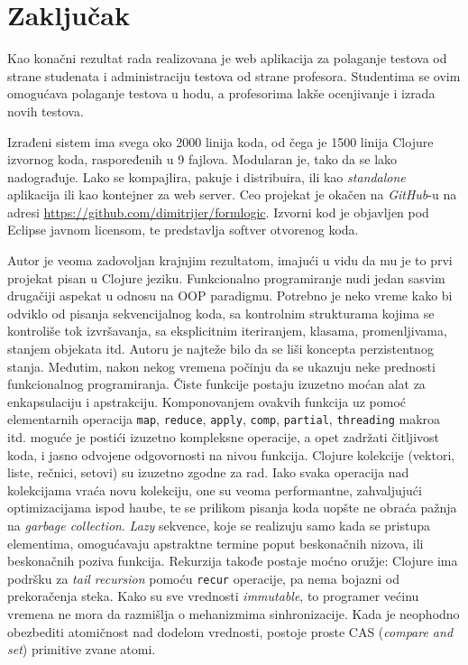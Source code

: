\chapter{Zaključak}\label{zakljucak}
Kao konačni rezultat rada realizovana je web aplikacija za polaganje testova od strane studenata i administraciju testova od strane profesora. Studentima se ovim omogućava polaganje testova u hodu, a profesorima lakše ocenjivanje i izrada novih testova.

Izrađeni sistem ima svega oko 2000 linija koda, od čega je 1500 linija Clojure izvornog koda, raspoređenih u 9 fajlova. Modularan je, tako da se lako nadograđuje. Lako se kompajlira, pakuje i distribuira, ili kao \textit{standalone} aplikacija ili kao kontejner za web server. Ceo projekat je okačen na \textit{GitHub}-u na adresi \url{https://github.com/dimitrijer/formlogic}. Izvorni kod je objavljen pod Eclipse javnom licensom, te predstavlja softver otvorenog koda.

Autor je veoma zadovoljan krajnjim rezultatom, imajući u vidu da mu je to prvi projekat pisan u Clojure jeziku. Funkcionalno programiranje nudi jedan sasvim drugačiji aspekat u odnosu na OOP paradigmu. Potrebno je neko vreme kako bi odviklo od pisanja sekvencijalnog koda, sa kontrolnim strukturama kojima se kontroliše tok izvršavanja, sa eksplicitnim iteriranjem, klasama, promenljivama, stanjem objekata itd. Autoru je najteže bilo da se liši koncepta perzistentnog stanja. Međutim, nakon nekog vremena počinju da se ukazuju neke prednosti funkcionalnog programiranja. Čiste funkcije postaju izuzetno moćan alat za enkapsulaciju i apstrakciju. Komponovanjem ovakvih funkcija uz pomoć elementarnih operacija \texttt{map}, \texttt{reduce}, \texttt{apply}, \texttt{comp}, \texttt{partial}, \texttt{threading} makroa itd. moguće je postići izuzetno kompleksne operacije, a opet zadržati čitljivost koda, i jasno odvojene odgovornosti na nivou funkcija. Clojure kolekcije (vektori, liste, rečnici, setovi) su izuzetno zgodne za rad. Iako svaka operacija nad kolekcijama vraća novu kolekciju, one su veoma performantne, zahvaljujući optimizacijama ispod haube, te se prilikom pisanja koda uopšte ne obraća pažnja na \textit{garbage collection}. \textit{Lazy} sekvence, koje se realizuju samo kada se pristupa elementima, omogućavaju apstraktne termine poput beskonačnih nizova, ili beskonačnih poziva funkcija. Rekurzija takođe postaje moćno oružje: Clojure ima podršku za \textit{tail recursion} pomoću \texttt{recur} operacije, pa nema bojazni od prekoračenja steka. Kako su sve vrednosti \textit{immutable}, to programer većinu vremena ne mora da razmišlja o mehanizmima sinhronizacije. Kada je neophodno obezbediti atomičnost nad dodelom vrednosti, postoje proste CAS (\textit{compare and set}) primitive zvane atomi.

